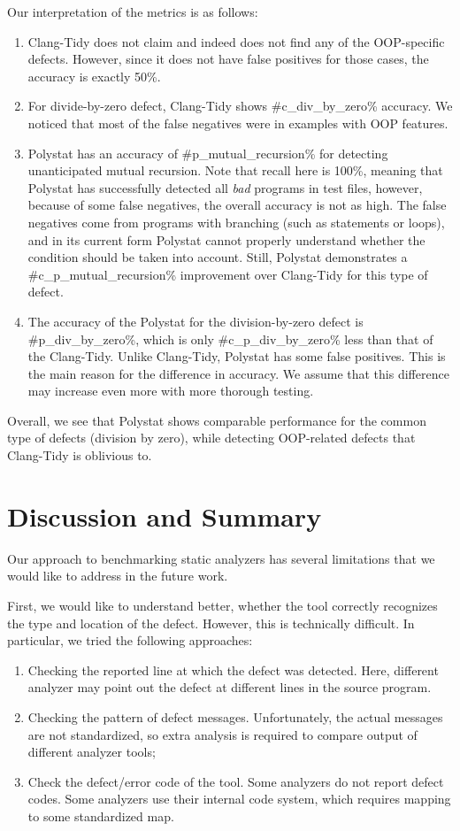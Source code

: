 Our interpretation of the metrics is as follows:
\begin{enumerate}
    \item Clang-Tidy does not claim and indeed does not find any of the OOP-specific defects. However, since it does not have false positives for those cases, the accuracy is exactly 50\%.
    \item For divide-by-zero defect, Clang-Tidy shows #c_div_by_zero\% accuracy. We noticed that most of the false negatives were in examples with OOP features.
    \item Polystat has an accuracy of #p_mutual_recursion\% for detecting unanticipated mutual recursion. Note that recall here is 100\%, meaning that Polystat has successfully detected all \emph{bad} programs in test files, however, because of some false negatives, the overall accuracy is not as high. The false negatives come from programs with branching (such as  statements or  loops), and in its current form Polystat cannot properly understand whether the condition should be taken into account. Still, Polystat demonstrates a #c_p_mutual_recursion\% improvement over Clang-Tidy for this type of defect.
    \item The accuracy of the Polystat for the division-by-zero defect is #p_div_by_zero\%, which is only #c_p_div_by_zero\% less than that of the Clang-Tidy. Unlike Clang-Tidy, Polystat has some false positives. This is the main reason for the difference in accuracy. We assume that this difference may increase even more with more thorough testing.
\end{enumerate}

Overall, we see that Polystat shows comparable performance for the common type of defects (division by zero), while detecting OOP-related defects that Clang-Tidy is oblivious to.

\section{Discussion and Summary}

Our approach to benchmarking static analyzers has several limitations that we would like to address in the future work.

First, we would like to understand better, whether the tool correctly recognizes the type and location of the defect. However, this is technically difficult. In particular, we tried the following approaches:
\begin{enumerate}
    \item Checking the reported line at which the defect was detected. Here, different analyzer may point out the defect at different lines in the source program.
    \item Checking the pattern of defect messages. Unfortunately, the actual messages are not standardized, so extra analysis is required to  compare output of different analyzer tools;
    \item Check the defect/error code of the tool. Some analyzers do not report defect codes. Some analyzers use their internal code system, which requires mapping to some standardized map.
\end{enumerate}

